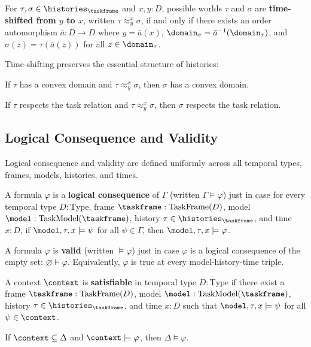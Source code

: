 \documentclass[../BimodalReference.tex]{subfiles}
\begin{document}
\begin{definition}
For $\tau, \sigma \in \histories_{\taskframe}$ and $x, y : D$, possible worlds $\tau$ and $\sigma$ are \textbf{time-shifted from $y$ to $x$}, written $\tau \approx_y^x \sigma$, if and only if there exists an order automorphism $\bar{a} : D \to D$ where $y = \bar{a}(x)$, $\domain_\sigma = \bar{a}^{-1}(\domain_\tau)$, and $\sigma(z) = \tau(\bar{a}(z))$ for all $z \in \domain_\sigma$.
\end{definition}

\noindent
Time-shifting preserves the essential structure of histories:

\begin{theorem}
If $\tau$ has a convex domain and $\tau \approx_y^x \sigma$, then $\sigma$ has a convex domain.
\end{theorem}

\begin{theorem}
If $\tau$ respects the task relation and $\tau \approx_y^x \sigma$, then $\sigma$ respects the task relation.
\end{theorem}

\subsection{Logical Consequence and Validity}

Logical consequence and validity are defined uniformly across all temporal types, frames, models, histories, and times.

\begin{definition}
A formula $\varphi$ is a \textbf{logical consequence} of $\Gamma$ (written $\Gamma \models \varphi$) just in case for every temporal type $D : \text{Type}$, frame $\taskframe : \text{TaskFrame}(D)$, model $\model : \text{TaskModel}(\taskframe)$, history $\tau \in \histories_{\taskframe}$, and time $x : D$, if $\model, \tau, x \models \psi$ for all $\psi \in \Gamma$, then $\model, \tau, x \models \varphi$.
\end{definition}

\begin{definition}[Validity]
A formula $\varphi$ is \textbf{valid} (written $\models \varphi$) just in case $\varphi$ is a logical consequence of the empty set: $\varnothing \models \varphi$.
Equivalently, $\varphi$ is true at every model-history-time triple.
\end{definition}

\begin{definition}[Satisfiability]
A context $\context$ is \textbf{satisfiable} in temporal type $D : \text{Type}$ if there exist a frame $\taskframe : \text{TaskFrame}(D)$, model $\model : \text{TaskModel}(\taskframe)$, history $\tau \in \histories_{\taskframe}$, and time $x : D$ such that $\model, \tau, x \models \psi$ for all $\psi \in \context$.
\end{definition}

\begin{theorem}[Monotonicity]
If $\context \subseteq \Delta$ and $\context \models \varphi$, then $\Delta \models \varphi$.
\end{theorem}
\end{document}
